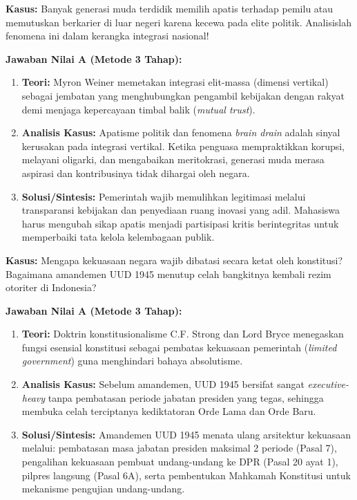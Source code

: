\documentclass[10pt,a4paper]{article}
\begin{document}
\begin{soalbox}
\textbf{Kasus:} Banyak generasi muda terdidik memilih apatis terhadap pemilu atau memutuskan berkarier di luar negeri karena kecewa pada elite politik. Analisislah fenomena ini dalam kerangka integrasi nasional!

\tcblower
\textbf{Jawaban Nilai A (Metode 3 Tahap):}
\begin{enumerate}
  \item \textbf{Teori:} Myron Weiner memetakan integrasi elit-massa (dimensi vertikal) sebagai jembatan yang menghubungkan pengambil kebijakan dengan rakyat demi menjaga kepercayaan timbal balik (\textit{mutual trust}).
  \item \textbf{Analisis Kasus:} Apatisme politik dan fenomena \textit{brain drain} adalah sinyal kerusakan pada integrasi vertikal. Ketika penguasa mempraktikkan korupsi, melayani oligarki, dan mengabaikan meritokrasi, generasi muda merasa aspirasi dan kontribusinya tidak dihargai oleh negara.
  \item \textbf{Solusi/Sintesis:} Pemerintah wajib memulihkan legitimasi melalui transparansi kebijakan dan penyediaan ruang inovasi yang adil. Mahasiswa harus mengubah sikap apatis menjadi partisipasi kritis berintegritas untuk memperbaiki tata kelola kelembagaan publik.
\end{enumerate}
\end{soalbox}

\begin{soalbox}
\textbf{Kasus:} Mengapa kekuasaan negara wajib dibatasi secara ketat oleh konstitusi? Bagaimana amandemen UUD 1945 menutup celah bangkitnya kembali rezim otoriter di Indonesia?

\tcblower
\textbf{Jawaban Nilai A (Metode 3 Tahap):}
\begin{enumerate}
  \item \textbf{Teori:} Doktrin konstitusionalisme C.F. Strong dan Lord Bryce menegaskan fungsi esensial konstitusi sebagai pembatas kekuasaan pemerintah (\textit{limited government}) guna menghindari bahaya absolutisme.
  \item \textbf{Analisis Kasus:} Sebelum amandemen, UUD 1945 bersifat sangat \textit{executive-heavy} tanpa pembatasan periode jabatan presiden yang tegas, sehingga membuka celah terciptanya kediktatoran Orde Lama dan Orde Baru.
  \item \textbf{Solusi/Sintesis:} Amandemen UUD 1945 menata ulang arsitektur kekuasaan melalui: pembatasan masa jabatan presiden maksimal 2 periode (Pasal 7), pengalihan kekuasaan pembuat undang-undang ke DPR (Pasal 20 ayat 1), pilpres langsung (Pasal 6A), serta pembentukan Mahkamah Konstitusi untuk mekanisme pengujian undang-undang.
\end{enumerate}
\end{soalbox}
\end{document}
